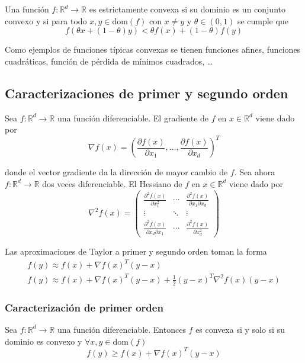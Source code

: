 Una función $f: \mathbb{R}^d \to \mathbb{R}$ es estrictamente convexa si su dominio es un conjunto convexo y si para todo $x, y \in \text{dom}(f)$ con $x \neq y$ y $\theta \in (0, 1)$ se cumple que
\begin{equation}
f(\theta x + (1 - \theta)y) < \theta f(x) + (1 - \theta)f(y)
\end{equation}

Como ejemplos de funciones típicas convexas se tienen funciones afines, funciones cuadráticas, función de pérdida de mínimos cuadrados, \dots

\subsection{Caracterizaciones de primer y segundo orden}

Sea $f: \mathbb{R}^d \to \mathbb{R}$ una función diferenciable. El gradiente de $f$ en $x \in \mathbb{R}^d$ viene dado por 
\begin{equation}
\nabla f(x) = \left( \frac{\partial f(x)}{\partial x_1}, \dots, \frac{\partial f(x)}{\partial x_d} \right)^T
\end{equation}

\noindent donde el vector gradiente da la dirección de mayor cambio de $f$. Sea ahora $f: \mathbb{R}^d \to \mathbb{R}$ dos veces diferenciable. El Hessiano de $f$ en $x \in \mathbb{R}^d$ viene dado por
\begin{equation}
\nabla^2 f (x) = 
\begin{pmatrix}
\frac{\partial^2 f(x)}{\partial x_1^2} & \cdots & \frac{\partial^2 f(x)}{\partial x_1 \partial x_d} \\
\vdots & \ddots & \vdots \\
\frac{\partial^2 f(x)}{\partial x_d \partial x_1} & \cdots & \frac{\partial^2 f(x)}{\partial x_d^2}
\end{pmatrix}
\end{equation}

\noindent Las aproximaciones de Taylor a primer y segundo orden toman la forma 
\begin{gather}
f(y) \approx f(x) + \nabla f(x)^T(y - x) \\
f(y) \approx f(x) + \nabla f(x)^T(y - x) + \frac{1}{2}(y - x)^T\nabla^2 f(x)(y - x)
\end{gather}

\subsubsection{Caracterización de primer orden}
Sea $f: \mathbb{R}^d \to \mathbb{R}$ una función diferenciable. Entonces $f$ es convexa si y solo si su dominio es convexo y $\forall x, y \in \text{dom}(f)$
\begin{equation}
f(y) \geq f(x) + \nabla f(x)^T(y - x)
\end{equation}

